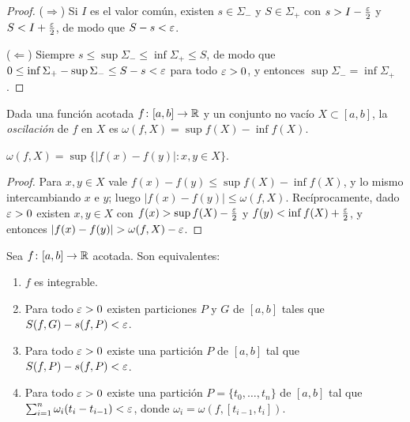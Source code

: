 \begin{proof}
  (\(\Rightarrow\)) Si \(I\) es el valor común, existen \(s \in \Sigma_{-}\) y \(S \in \Sigma_{+}\) con \(s > I - \frac{\varepsilon}{2}\) y \(S < I + \frac{\varepsilon}{2}\), de modo que \(S - s < \varepsilon\).

  (\(\Leftarrow\)) Siempre \(s \leq \sup \Sigma_{-} \leq \inf \Sigma_{+} \leq S\), de modo que \(0 \leq \inf \Sigma_{+} - \sup \Sigma_{-} \leq S - s < \varepsilon\) para todo \(\varepsilon > 0\), y entonces \(\sup \Sigma_{-} = \inf \Sigma_{+}\).
\end{proof}

\begin{definition}[Oscilación]
  Dada una función acotada \(f\colon [a, b] \to \mathbb{R}\) y un conjunto no vacío \(X \subset [a, b]\), la \emph{oscilación} de \(f\) en \(X\) es \(\omega(f, X) = \sup f(X) - \inf f(X)\).
\end{definition}

\begin{note}
  \(\omega(f, X) = \sup \{ |f(x) - f(y)| : x, y \in X \}\).
\end{note}

\begin{proof}
  Para \(x, y \in X\) vale \(f(x) - f(y) \leq \sup f(X) - \inf f(X)\), y lo mismo intercambiando \(x\) e \(y\); luego \(|f(x) - f(y)| \leq \omega(f, X)\). Recíprocamente, dado \(\varepsilon > 0\) existen \(x, y \in X\) con \(f(x) > \sup f(X) - \frac{\varepsilon}{2}\) y \(f(y) < \inf f(X) + \frac{\varepsilon}{2}\), y entonces \(|f(x) - f(y)| > \omega(f, X) - \varepsilon\).
\end{proof}

\begin{theorem}
  Sea \(f\colon [a, b] \to \mathbb{R}\) acotada. Son equivalentes:
  \begin{enumerate}[label=(\arabic*)]
    \item \(f\) es integrable.
    \item Para todo \(\varepsilon > 0\) existen particiones \(P\) y \(G\) de \([a, b]\) tales que \(S(f, G) - s(f, P) < \varepsilon\).
    \item Para todo \(\varepsilon > 0\) existe una partición \(P\) de \([a, b]\) tal que \(S(f, P) - s(f, P) < \varepsilon\).
    \item Para todo \(\varepsilon > 0\) existe una partición \(P = \{ t_0, \dots, t_n \}\) de \([a, b]\) tal que \(\sum_{i=1}^{n} \omega_i (t_i - t_{i-1}) < \varepsilon\), donde \(\omega_i = \omega(f, [t_{i-1}, t_i])\).
  \end{enumerate}
\end{theorem}


